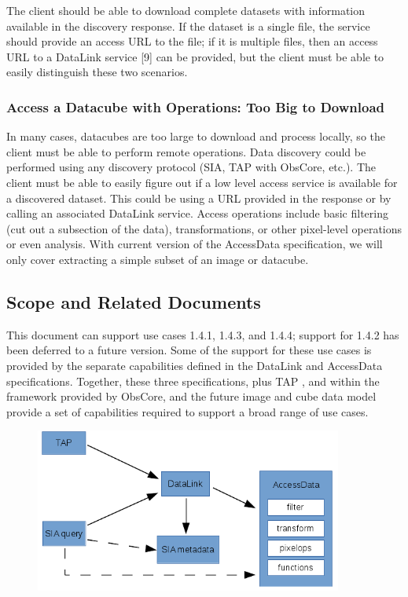 \documentclass[11pt,a4paper]{ivoa}
\begin{document}
The client should be able to download complete datasets with information available in the discovery response. If the dataset is a single file, the service should provide an access URL to the file; if it is multiple files, then an access URL to a DataLink service [9] can be provided, but the client must be able to easily distinguish these two scenarios.

\subsubsection{Access a Datacube with Operations: Too Big to Download}
\label{sec:async}
In many cases, datacubes are too large to download and process locally, so the client must be able to perform remote operations. Data discovery could be performed using any discovery protocol (SIA, TAP with ObsCore, etc.).  The client must be able to easily figure out if a low level access service is available for a discovered dataset. This could be using a URL provided in the response or by calling an associated DataLink service. Access operations include basic filtering (cut out a subsection of the data), transformations, or other pixel-level operations or even analysis. With current  version of the AccessData specification, we will only cover extracting a simple subset of an image or datacube. 

\subsection{Scope and Related Documents}
\label{sec:examples}

This document can  support use cases 1.4.1, 1.4.3, and 1.4.4; support for 1.4.2 has been deferred to a future version. Some of the support for these use cases is provided by the separate capabilities defined in the DataLink and AccessData specifications. Together, these three specifications, plus TAP \citep{std:TAP}, and  within the framework provided by ObsCore, and the future image and cube data model provide a set of capabilities required to support a broad range of use cases.


\begin{figure}[H]
\centering

\includegraphics[width=0.9\textwidth]{schema.png}
\label{fig:architecture}
\end{figure}
\end{document}
